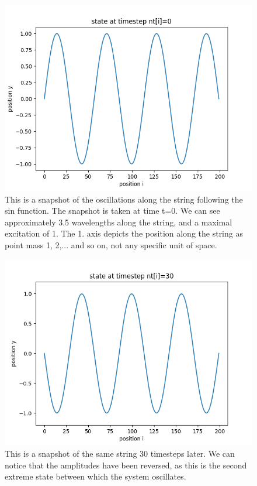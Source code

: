 \documentclass[12pt]{article}
\begin{document}
\begin{figure}[ht]
	\includegraphics[scale=0.7]{state_timestep_0}
	\caption{This is a snapshot of the oscillations along the string following the sin function. The snapshot is taken at time t=0. We can see approximately 3.5 wavelengths along the string, and a maximal excitation of 1. The 1. axis depicts the position along the string as point mass 1, 2,... and so on, not any specific unit of space.}
\end{figure}
\begin{figure}[H]
	\includegraphics[scale=0.7]{state_timestep_30}
	\caption{This is a snapshot of the same string 30 timesteps later. We can notice that the amplitudes have been reversed, as this is the second extreme state between which the system oscillates.}
\end{figure}
\end{document}
